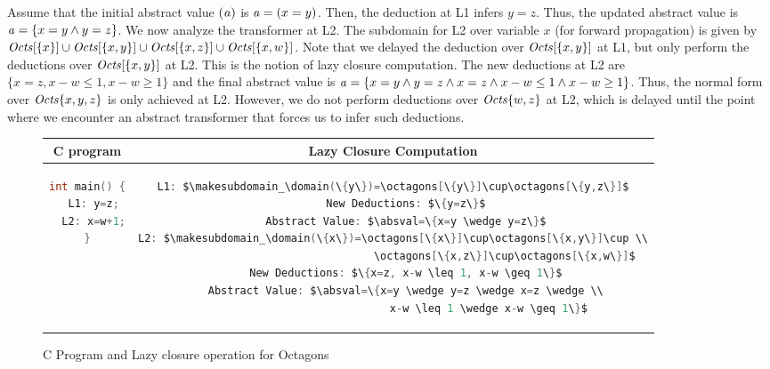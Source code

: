 {Assume that the initial abstract value $(\mathit{a})$ is $\mathit{a}=(x=y)$. 
Then, the deduction at L1 infers ${y=z}$.  Thus, the updated abstract value
is $\mathit{a}=\{x=y \wedge y=z\}$.  We now analyze the transformer at L2.  The
subdomain for L2 over variable $x$ (for forward propagation) is given by
$\mathit{Octs}[\{x\}]\cup\mathit{Octs}[\{x,y\}]\cup\mathit{Octs}[\{x,z\}]\cup\mathit{Octs}[\{x,w\}]$. 
Note that we delayed the deduction over $\mathit{Octs}[\{x,y\}]$ at L1, but only
perform the deductions over $\mathit{Octs}[\{x,y\}]$ at L2.  This is the notion
of lazy closure computation.  The new deductions at L2 are $\{x=z, x-w \leq
1, x-w \geq 1\}$ and the final abstract value is $\mathit{a}=\{x=y
\wedge\allowbreak y=z \wedge\allowbreak x=z \wedge\allowbreak x-w \leq 1
\wedge x-w \geq 1\}$.  Thus, the normal form over $\mathit{Octs}{\{x,y,z\}}$ is
only achieved at L2.  However, we do not perform deductions over
$\mathit{Octs}{\{w,z\}}$ at L2, which is delayed until the point where we
encounter an abstract transformer that forces us to infer such deductions.
%
\begin{figure}[htbp]
\centering
\begin{tabular}{c|c}
\hline
C program & Lazy Closure Computation \\
\hline
\scriptsize
\begin{lstlisting}[mathescape=true,language=C]
int main() {
  L1: y=z;
  L2: x=w+1;
}
\end{lstlisting}
&
\begin{lstlisting}[mathescape=true,language=C]
L1: $\makesubdomain_\domain(\{y\})=\octagons[\{y\}]\cup\octagons[\{y,z\}]$
    New Deductions: $\{y=z\}$
    Abstract Value: $\absval=\{x=y \wedge y=z\}$
L2: $\makesubdomain_\domain(\{x\})=\octagons[\{x\}]\cup\octagons[\{x,y\}]\cup \\
                                   \octagons[\{x,z\}]\cup\octagons[\{x,w\}]$
    New Deductions: $\{x=z, x-w \leq 1, x-w \geq 1\}$
    Abstract Value: $\absval=\{x=y \wedge y=z \wedge x=z \wedge \\
                              x-w \leq 1 \wedge x-w \geq 1\}$
\end{lstlisting}
\\
\hline
\end{tabular}
\caption{\label{fig:lazyclosure}
C Program and Lazy closure operation for Octagons}
\end{figure}
%
}

